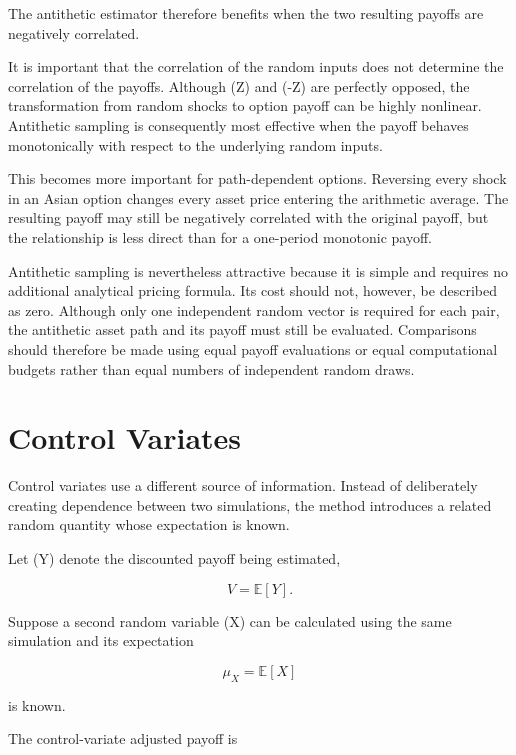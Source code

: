 \documentclass[12pt,a4paper]{report}
\begin{document}
The antithetic estimator therefore benefits when the two resulting payoffs are negatively correlated.

It is important that the correlation of the random inputs does not determine the correlation of the payoffs. Although (Z) and (-Z) are perfectly opposed, the transformation from random shocks to option payoff can be highly nonlinear. Antithetic sampling is consequently most effective when the payoff behaves monotonically with respect to the underlying random inputs.

This becomes more important for path-dependent options. Reversing every shock in an Asian option changes every asset price entering the arithmetic average. The resulting payoff may still be negatively correlated with the original payoff, but the relationship is less direct than for a one-period monotonic payoff.

Antithetic sampling is nevertheless attractive because it is simple and requires no additional analytical pricing formula. Its cost should not, however, be described as zero. Although only one independent random vector is required for each pair, the antithetic asset path and its payoff must still be evaluated. Comparisons should therefore be made using equal payoff evaluations or equal computational budgets rather than equal numbers of independent random draws.

\section{Control Variates}

Control variates use a different source of information. Instead of deliberately creating dependence between two simulations, the method introduces a related random quantity whose expectation is known.

Let (Y) denote the discounted payoff being estimated,

\begin{equation}
V
=
\mathbb{E}[Y].
\end{equation}

Suppose a second random variable (X) can be calculated using the same simulation and its expectation

\begin{equation}
\mu_X
=
\mathbb{E}[X]
\end{equation}

is known.

The control-variate adjusted payoff is
\end{document}
